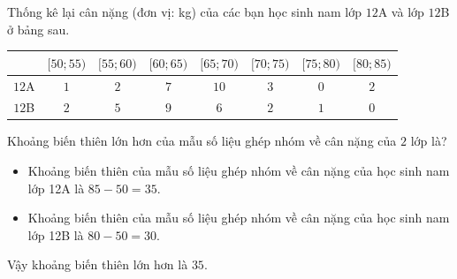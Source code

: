 \begin{ex}%
	Thống kê lại cân nặng (đơn vị: kg) của các bạn học sinh nam lớp $12$A và lớp $12$B ở bảng sau.
	\begin{center}
		\begin{tabular}{|c|c|c|c|c|c|c|c|}
			\hline \diagbox[width=8em]{Lớp}{Cân nặng}  & {$[50 ; 55)$} & {$[55 ; 60)$} & {$[60 ; 65)$} & {$[65 ; 70)$} & {$[70 ; 75)$} & {$[75 ; 80)$} & {$[80 ; 85)$} \\
			\hline $12$A & $1$ & $2$ & $7$ & $10$ & $3$ & $0$ & $2$ \\
			\hline $12$B & $2$ & $5$ & $9$ & $6$ & $2$ & $1$ & $0$ \\
			\hline
		\end{tabular}
	\end{center}
	Khoảng biến thiên lớn hơn của mẫu số liệu ghép nhóm về cân nặng của $2$ lớp là?
	\loigiai
	{
		\begin{itemize}
			\item Khoảng biến thiên của mẫu số liệu ghép nhóm về cân nặng của học sinh nam lớp 12A là $85-50=35$.
			\item Khoảng biến thiên của mẫu số liệu ghép nhóm về cân nặng của học sinh nam lớp 12B là $80-50=30$.
		\end{itemize}
		Vậy khoảng biến thiên lớn hơn là $35$.
	}
\end{ex}

